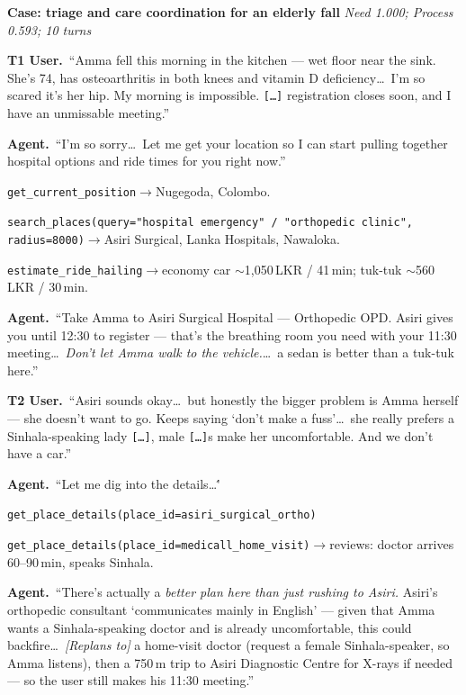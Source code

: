 \noindent\textbf{Case: triage and care coordination for an elderly fall} \hfill \emph{Need 1.000; Process 0.593; 10 turns}

\begin{tcolorbox}[breakable,arc=3pt,boxrule=0.4pt,colback=mindlabbg,colframe=mindlabline,left=6pt,right=6pt,top=5pt,bottom=5pt,before skip=6pt,after skip=6pt]
\footnotesize\setlength{\parindent}{0pt}\raggedright

{\color{mindlabmuted}\textbf{T1 \textbar{} User.}\ ``Amma fell this morning in the kitchen --- wet floor near the sink. She's 74, has osteoarthritis in both knees and vitamin D deficiency\ldots\ I'm so scared it's her hip. My morning is impossible. \texttt{[\ldots]} registration closes soon, and I have an unmissable meeting.''}\par\smallskip
{\color{mindlabink}\textbf{Agent.}\ ``I'm so sorry\ldots\ Let me get your location so I can start pulling together hospital options and ride times for you right now.''}\par
\texttt{get\_current\_position}\;$\to$\;Nugegoda, Colombo.\par
\texttt{search\_places(query="hospital emergency"\,/\,"orthopedic clinic", radius=8000)}\;$\to$\;Asiri Surgical, Lanka Hospitals, Nawaloka.\par
\texttt{estimate\_ride\_hailing}\;$\to$\;economy car $\sim$1{,}050\,LKR / 41\,min; tuk-tuk $\sim$560\,LKR / 30\,min.\par\smallskip
{\color{mindlabink}\textbf{Agent.}\ ``Take Amma to Asiri Surgical Hospital --- Orthopedic OPD. Asiri gives you until 12:30 to register --- that's the breathing room you need with your 11:30 meeting\ldots\ \emph{Don't let Amma walk to the vehicle.}\ldots\ a sedan is better than a tuk-tuk here.''}\par\medskip

{\color{mindlabmuted}\textbf{T2 \textbar{} User.}\ ``Asiri sounds okay\ldots\ but honestly the bigger problem is Amma herself --- she doesn't want to go. Keeps saying `don't make a fuss'\ldots\ she really prefers a Sinhala-speaking lady \texttt{[\ldots]}, male \texttt{[\ldots]}s make her uncomfortable. And we don't have a car.''}\par\smallskip
{\color{mindlabink}\textbf{Agent.}\ ``Let me dig into the details\ldots\''}\par
\texttt{get\_place\_details(place\_id=asiri\_surgical\_ortho)}\par
\texttt{get\_place\_details(place\_id=medicall\_home\_visit)}\;$\to$\;reviews: doctor arrives 60--90\,min, speaks Sinhala.\par\medskip
{\color{mindlabink}\textbf{Agent.}\ ``There's actually a \emph{better plan here than just rushing to Asiri.} Asiri's orthopedic consultant `communicates mainly in English' --- given that Amma wants a Sinhala-speaking doctor and is already uncomfortable, this could backfire\ldots\ \emph{[Replans to]} a home-visit doctor (request a female Sinhala-speaker, so Amma listens), then a 750\,m trip to Asiri Diagnostic Centre for X-rays if needed --- so the user still makes his 11:30 meeting.''}\par\medskip


\end{tcolorbox}
